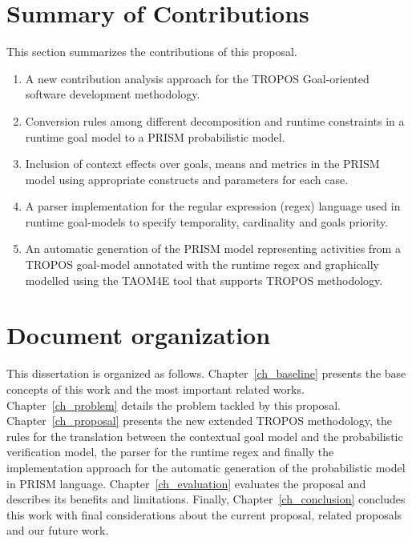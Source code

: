 \section{Summary of Contributions}

This section summarizes the contributions of this proposal.


\begin{enumerate}

\item A new contribution analysis approach for the TROPOS Goal-oriented software development methodology.

\item Conversion rules among different decomposition and runtime constraints in a runtime goal model to a PRISM probabilistic model.

\item Inclusion of context effects over goals, means and metrics in the PRISM model using appropriate constructs and parameters for each case.

\item A parser implementation for the regular expression (regex) language used in runtime goal-models to specify temporality, cardinality and goals priority. 

\item An automatic generation of the PRISM model representing activities from a TROPOS goal-model annotated with the runtime regex and graphically modelled using the TAOM4E tool that supports TROPOS methodology.

\end{enumerate}

\section{Document organization}

This dissertation is organized as follows. Chapter~\ref{ch_baseline} presents the base concepts of this work and the most important related works. Chapter~\ref{ch_problem} details the problem tackled by this proposal. Chapter~\ref{ch_proposal} presents the new extended TROPOS methodology, the rules for the translation between the contextual goal model and the probabilistic verification model, the parser for the runtime regex and finally the implementation approach for the automatic generation of the probabilistic model in PRISM language. Chapter~\ref{ch_evaluation} evaluates the proposal and describes its benefits and limitations. Finally, Chapter~\ref{ch_conclusion} concludes this work with final considerations about the current proposal, related proposals and our future work.